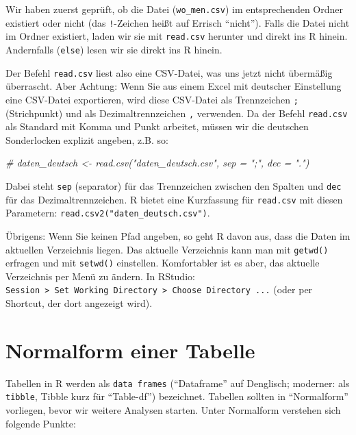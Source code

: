 \documentclass[12pt,]{book}
\newenvironment{Shaded}{\begin{snugshade}}{\end{snugshade}}
\newcommand{\CommentTok}[1]{\textcolor[rgb]{0.56,0.35,0.01}{\textit{{#1}}}}
\begin{document}
Wir haben zuerst geprüft, ob die Datei (\texttt{wo\_men.csv}) im
entsprechenden Ordner existiert oder nicht (das \texttt{!}-Zeichen heißt
auf Errisch ``nicht''). Falls die Datei nicht im Ordner existiert, laden
wir sie mit \texttt{read.csv} herunter und direkt ins R hinein.
Andernfalls (\texttt{else}) lesen wir sie direkt ins R hinein.

Der Befehl \texttt{read.csv} liest also eine CSV-Datei, was uns jetzt
nicht übermäßig überrascht. Aber Achtung: Wenn Sie aus einem Excel mit
deutscher Einstellung eine CSV-Datei exportieren, wird diese CSV-Datei
als Trennzeichen \texttt{;} (Strichpunkt) und als Dezimaltrennzeichen
\texttt{,} verwenden. Da der Befehl \texttt{read.csv} als Standard mit
Komma und Punkt arbeitet, müssen wir die deutschen Sonderlocken explizit
angeben, z.B. so:

\begin{Shaded}
\begin{Highlighting}[]
\CommentTok{# daten_deutsch <- read.csv("daten_deutsch.csv", sep = ";", dec = ".")}
\end{Highlighting}
\end{Shaded}

Dabei steht \texttt{sep} (separator) für das Trennzeichen zwischen den
Spalten und \texttt{dec} für das Dezimaltrennzeichen. R bietet eine
Kurzfassung für \texttt{read.csv} mit diesen Parametern:
\texttt{read.csv2("daten\_deutsch.csv")}.

Übrigens: Wenn Sie keinen Pfad angeben, so geht R davon aus, dass die
Daten im aktuellen Verzeichnis liegen. Das aktuelle Verzeichnis kann man
mit \texttt{getwd()} erfragen und mit \texttt{setwd()} einstellen.
Komfortabler ist es aber, das aktuelle Verzeichnis per Menü zu ändern.
In RStudio:
\texttt{Session\ \textgreater{}\ Set\ Working\ Directory\ \textgreater{}\ Choose\ Directory\ ...}
(oder per Shortcut, der dort angezeigt wird).

\section{Normalform einer Tabelle}\label{normalform-einer-tabelle}

Tabellen in R werden als \texttt{data\ frames} (``Dataframe'' auf
Denglisch; moderner: als \texttt{tibble}, Tibble kurz für ``Table-df'')
bezeichnet. Tabellen sollten in ``Normalform'' vorliegen, bevor wir
weitere Analysen starten. Unter Normalform verstehen sich folgende
Punkte:
\end{document}
